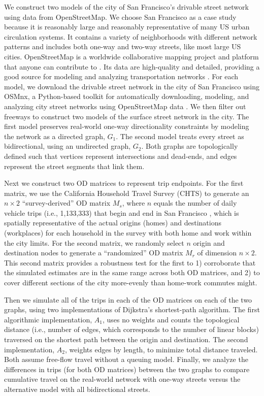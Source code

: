 \documentclass{trbunofficial}
\begin{document}
We construct two models of the city of San Francisco's drivable street network using data from OpenStreetMap. We choose San Francisco as a case study because it is reasonably large and reasonably representative of many US urban circulation systems. It contains a variety of neighborhoods with different network patterns and includes both one-way and two-way streets, like most large US cities. OpenStreetMap is a worldwide collaborative mapping project and platform that anyone can contribute to \cite{jokar_arsanjani_openstreetmap_2015}. Its data are high-quality and detailed, providing a good source for modeling and analyzing transportation networks \cite{barron_comprehensive_2014,zielstra_assessing_2013,barrington-leigh_worlds_2017}. For each model, we download the drivable street network in the city of San Francisco using OSMnx, a Python-based toolkit for automatically downloading, modeling, and analyzing city street networks using OpenStreetMap data \cite{boeing_osmnx:_2017,boeing_multi-scale_2018,boeing_street_2019}. We then filter out freeways to construct two models of the surface street network in the city. The first model preserves real-world one-way directionality constraints by modeling the network as a directed graph, $G_1$. The second model treats every street as bidirectional, using an undirected graph, $G_2$. Both graphs are topologically defined such that vertices represent intersections and dead-ends, and edges represent the street segments that link them.

Next we construct two OD matrices to represent trip endpoints. For the first matrix, we use the California Household Travel Survey (CHTS) to generate an $n \times 2$ \enquote{survey-derived} OD matrix $M_s$, where $n$ equals the number of daily vehicle trips (i.e., 1,133,333) that begin and end in San Francisco \cite{san_francisco_county_transportation_authority_tncs_2017}, which is spatially representative of the actual origins (homes) and destinations (workplaces) for each household in the survey with both home and work within the city limits. For the second matrix, we randomly select $n$ origin and destination nodes to generate a \enquote{randomized} OD matrix $M_r$ of dimension $n \times 2$. This second matrix provides a robustness test for the first to 1) corroborate that the simulated estimates are in the same range across both OD matrices, and 2) to cover different sections of the city more-evenly than home-work commutes might.

Then we simulate all of the trips in each of the OD matrices on each of the two graphs, using two implementations of Dijkstra's shortest-path algorithm. The first algorithmic implementation, $A_1$, uses no weights and counts the topological distance (i.e., number of edges, which corresponds to the number of linear blocks) traversed on the shortest path between the origin and destination. The second implementation, $A_2$, weights edges by length, to minimize total distance traveled. Both assume free-flow travel without a queuing model. Finally, we analyze the differences in trips (for both OD matrices) between the two graphs to compare cumulative travel on the real-world network with one-way streets versus the alternative model with all bidirectional streets.
\end{document}
